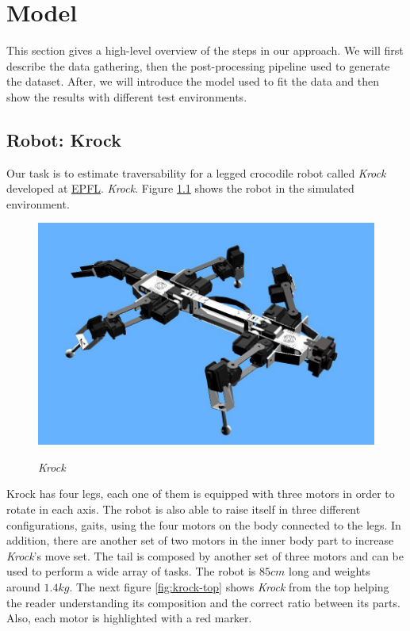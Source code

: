 \documentclass[../document.tex]{subfiles}
\begin{document}
\chapter{Model}
This section gives a high-level overview of the steps in our approach. We will first describe the data gathering,  then the post-processing pipeline used to generate the dataset. After, we will introduce the model used to fit the data and then show the results with different test environments.
\section{Robot: Krock}
Our task is to estimate traversability for a legged crocodile robot called \emph{Krock} developed at \href{https://duckduckgo.com/?q=EPFL&atb=v154-1__&ia=web}{EPFL}.
\emph{Krock}. Figure \ref{fig:krock} shows the robot in the simulated environment.
\begin{figure} [htbp]
    \centering
    \includegraphics[width=0.5\linewidth]{../img/krock-1.jpg}
    \label{fig:krock}
    \caption{\emph{Krock}}
\end{figure}
Krock has four legs, each one of them is equipped with three motors in order to rotate in each axis. The robot is also able to raise itself in three different configurations, gaits, using the four motors on the body connected to the legs. In addition, there are another set of two motors in the inner body part to increase \emph{Krock}'s move set. 
The tail is composed by another set of three motors and can be used to perform a wide array of tasks.
The robot is $85cm$ long and weights around $1.4kg$. The next figure \ref{fig:krock-top} shows \emph{Krock} from the top helping the reader understanding its composition and the correct ratio between its parts. Also, each motor is highlighted with a red marker.
\end{document}
